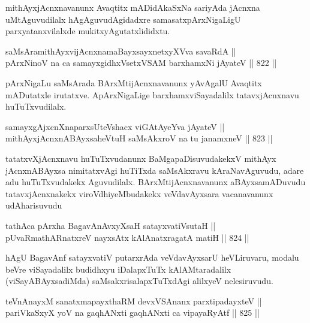 \begin{artha}
mithAyxjAcnxnavanunx Avaqtitx mADidAkaSxNa sariyAda jAcnxna uMtAguvudilalx \-hAgAguvudAgidadxre samasatxpArxNigaLigU parxyatanxvilalxde mukitxyAgutatxlididxtu.
\end{artha}

\begin{shl}
saMsAramithAyxvijAcnxnamaBayxsayxnetxyXVva savaRdA || \\
pArxNinoV na ca samayxgidhxVsetxVSAM barxhamxNi jAyateV \hfill || 822 ||  
\end{shl}

\begin{artha}
pArxNigaLu saMsArada BArxMtijAcnxnavanunx yAvAgalU Avaqtitx mADutatxle irutatxve. ApArxNigaLige barxhamxviSayadalilx tatavxjAcnxnavu huTuTxvudilalx.
\end{artha}

\begin{shl}
samayxgAjxcnXnaparxsUteVshacx viGAtAyeYva jAyateV || \\
mithAyxjAcnxnABAyxsaheVtuH saMsAkxroV na tu janamxneV \hfill || 823 ||  
\end{shl}

\begin{artha}
tatatxvXjAcnxnavu huTuTxvudanunx BaMgapaDisuvudakekxV mithAyx jAcnxnABAyxsa nimitatxvAgi huTiTxda saMsAkxravu kAraNavAguvudu, adare adu huTuTxvudakekx Aguvudilalx. BArxMtijAcnxnavanunx aBAyxsamADuvudu tatavxjAcnxnakekx viroVdhiyeMbudakekx veVdavAyxsara vacanavanunx udAharisuvudu
\end{artha}

\begin{shl}
tathAca pArxha BagavAnAvxyXsaH satayxvatiVsutaH || \\
pUvaRmathARnatxreV nayxsAtx kAlAnatxragatA matiH \hfill || 824 ||  
\end{shl}

\begin{artha}
hAgU BagavAnf satayxvatiV putarxrAda veVdavAyxsarU heVLiruvaru, modalu beVre viSayadalilx budidhxyu iDalapxTuTx kAlAMtaradalilx (viSayABAyxsadiMda) saMsakxrisalapxTuTxdAgi alilxyeV nelesiruvudu.
\end{artha}

\begin{shl}
teVnAnayxM sanatxmapayxthaRM devxVSAnanx parxtipadayxteV || \\
pariVkaSxyX yoV na gaqhANxti gaqhANxti ca vipayaRyAtf \hfill || 825 ||  
\end{shl}

